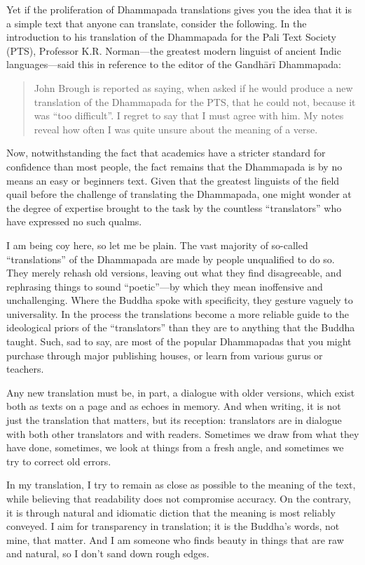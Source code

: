 \documentclass[12pt,openany]{book}%
\begin{document}
Yet if the proliferation of Dhammapada translations gives you the idea that it is a simple text that anyone can translate, consider the following. In the introduction to his translation of the Dhammapada for the Pali Text Society (PTS), Professor K.R. Norman—the greatest modern linguist of ancient Indic languages—said this in reference to the editor of the \textsanskrit{Gandhārī} Dhammapada:

\begin{quotation}%
John Brough is reported as saying, when asked if he would produce a new translation of the Dhammapada for the PTS, that he could not, because it was “too difficult”. I regret to say that I must agree with him. My notes reveal how often I was quite unsure about the meaning of a verse.

%
\end{quotation}

Now, notwithstanding the fact that academics have a stricter standard for confidence than most people, the fact remains that the Dhammapada is by no means an easy or beginners text. Given that the greatest linguists of the field quail before the challenge of translating the Dhammapada, one might wonder at the degree of expertise brought to the task by the countless “translators” who have expressed no such qualms.

I am being coy here, so let me be plain. The vast majority of so-called “translations” of the Dhammapada are made by people unqualified to do so. They merely rehash old versions, leaving out what they find disagreeable, and rephrasing things to sound “poetic”—by which they mean inoffensive and unchallenging. Where the Buddha spoke with specificity, they gesture vaguely to universality. In the process the translations become a more reliable guide to the ideological priors of the “translators” than they are to anything that the Buddha taught. Such, sad to say, are most of the popular Dhammapadas that you might purchase through major publishing houses, or learn from various gurus or teachers.

Any new translation must be, in part, a dialogue with older versions, which exist both as texts on a page and as echoes in memory. And when writing, it is not just the translation that matters, but its reception: translators are in dialogue with both other translators and with readers. Sometimes we draw from what they have done, sometimes, we look at things from a fresh angle, and sometimes we try to correct old errors.

In my translation, I try to remain as close as possible to the meaning of the text, while believing that readability does not compromise accuracy. On the contrary, it is through natural and idiomatic diction that the meaning is most reliably conveyed. I aim for transparency in translation; it is the Buddha’s words, not mine, that matter. And I am someone who finds beauty in things that are raw and natural, so I don’t sand down rough edges.
\end{document}
